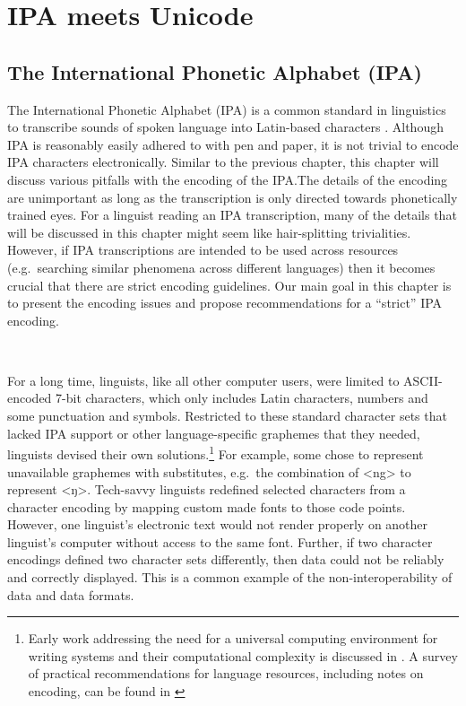 \chapter{IPA meets Unicode}
\label{ipa-meets-unicode}

\section{The International Phonetic Alphabet (IPA)}
\label{the-international-phonetic-alphabet}

The International Phonetic Alphabet (IPA) is a common standard in linguistics to
transcribe sounds of spoken language into Latin-based characters
\citep{IPA2005}. Although IPA is reasonably easily adhered to with pen and
paper, it is not trivial to encode IPA characters electronically. Similar to the
previous chapter, this chapter will discuss various pitfalls with the encoding
of the IPA.\@ The details of the encoding are unimportant as long as the
transcription is only directed towards phonetically trained eyes. For a linguist
reading an IPA transcription, many of the details that will be discussed in this
chapter might seem like hair-splitting trivialities. However, if IPA
transcriptions are intended to be used across resources (e.g.~searching similar
phenomena across different languages) then it becomes crucial that there are strict
encoding guidelines. Our main goal in this chapter is to present the encoding
issues and propose recommendations for a ``strict'' IPA encoding.

\ 

\noindent For a long time, linguists, like all other computer users, were limited to
ASCII-encoded 7-bit characters, which only includes Latin characters, numbers
and some punctuation and symbols. Restricted to these standard character sets
that lacked IPA support or other language-specific graphemes that they needed,
linguists devised their own solutions.\footnote{Early work addressing the need
for a universal computing environment for writing systems and their
computational complexity is discussed in \citet{Simons1989}. A survey of
practical recommendations for language resources, including notes on encoding,
can be found in \citet{BirdSimons2003}} For example, some chose to represent
unavailable graphemes with substitutes, e.g.~the combination of <ng> to
represent <ŋ>. Tech-savvy linguists redefined selected characters from a
character encoding by mapping custom made fonts to those code points. However,
one linguist's electronic text would not render properly on another linguist's
computer without access to the same font. Further, if two character encodings
defined two character sets differently, then data could not be reliably and
correctly displayed. This is a common example of the non-interoperability of
data and data formats.

